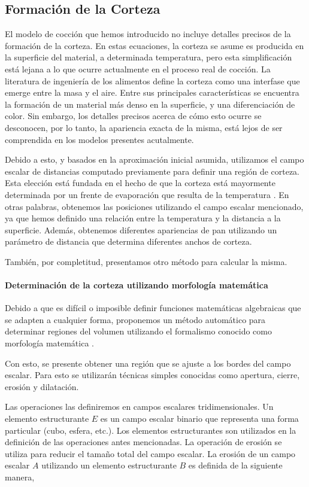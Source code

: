 \subsection{Formación de la Corteza}
El modelo de cocción que hemos introducido no incluye detalles precisos de la formación de la corteza.
En estas ecuaciones, la corteza se asume es producida en la superficie del material, a determinada temperatura, pero esta simplificación está lejana a lo que ocurre actualmente en el proceso real de cocción.
La literatura de ingeniería de los alimentos define la corteza como una interfase que emerge entre la masa y el aire.
Entre sus principales características se encuentra la formación de un material más denso en la superficie, y una diferenciación de color.
Sin embargo, los detalles precisos acerca de cómo esto ocurre se desconocen, por lo tanto, la apariencia exacta de la misma, está lejos de ser comprendida en los modelos presentes acutalmente.

Debido a esto, y basados en la aproximación inicial asumida, utilizamos el campo escalar de distancias computado previamente para definir una región de corteza.
Esta elección está fundada en el hecho de que la corteza está mayormente determinada por un frente de evaporación que resulta de la temperatura \cite{Jefferson2007}.
En otras palabras, obtenemos las posiciones utilizando el campo escalar mencionado, ya que hemos definido una relación entre la temperatura y la distancia a la superficie.
Además, obtenemos diferentes apariencias de pan utilizando un parámetro de distancia que determina diferentes anchos de corteza.

También, por completitud, presentamos otro método para calcular la misma.

\paragraph{Determinación de la corteza utilizando morfología matemática}
Debido a que es difícil o imposible definir funciones matemáticas algebraicas que se adapten a cualquier forma, proponemos un método automático para determinar regiones del volumen utilizando el formalismo conocido como morfología matemática \cite{Gonzalez2001}.

Con esto, se presente obtener una región que se ajuste a los bordes del campo escalar.
Para esto se utilizarán técnicas simples conocidas como apertura, cierre, erosión y dilatación.

Las operaciones las definiremos en campos escalares tridimensionales.
Un elemento estructurante $E$ es un campo escalar binario que representa una forma particular (cubo, esfera, etc.).
Los elementos estructurantes son utilizados en la definición de las operaciones antes mencionadas.
La operación de erosión se utiliza para reducir el tamaño total del campo escalar.
La erosión de un campo escalar $A$ utilizando un elemento estructurante $B$ es definida de la siguiente manera,

